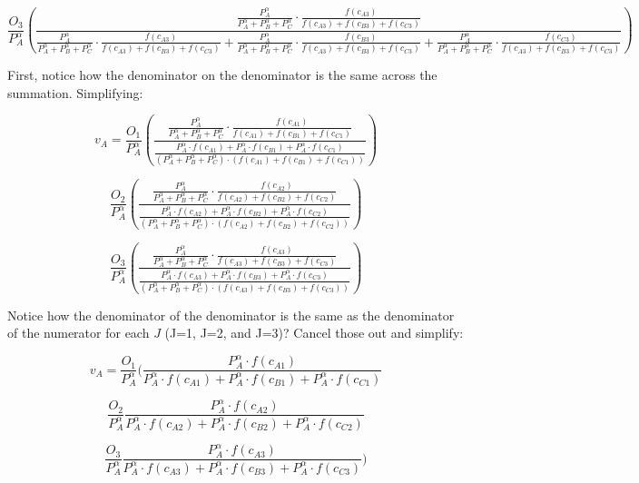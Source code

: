 \documentclass[]{elsarticle} %
\begin{document}
\[
\frac{O_3}{P_{A}^\alpha}(\frac{\frac{P_{A}^\alpha}{P_{A}^\alpha+P_{B}^\alpha+P_{C}^\alpha} \cdot \frac{f(c_{A3})}{f(c_{A3})+f(c_{B3})+f(c_{C3})}}{\frac{P_{A}^\alpha}{P_{A}^\alpha+P_{B}^\alpha+P_{C}^\alpha} \cdot \frac{f(c_{A3})}{f(c_{A3})+f(c_{B3})+f(c_{C3})} + \frac{P_{A}^\alpha}{P_{A}^\alpha+P_{B}^\alpha+P_{C}^\alpha} \cdot \frac{f(c_{B3})}{f(c_{A3})+f(c_{B3})+f(c_{C3})}+\frac{P_{A}^\alpha}{P_{A}^\alpha+P_{B}^\alpha+P_{C}^\alpha} \cdot \frac{f(c_{C3})}{f(c_{A3})+f(c_{B3})+f(c_{C3})}} )
\]

First, notice how the denominator on the denominator is the same across
the summation. Simplifying:

\[
v_{A} = \frac{O_1}{P_{A}^\alpha}(\frac{\frac{P_{A}^\alpha}{P_{A}^\alpha+P_{B}^\alpha+P_{C}^\alpha} \cdot \frac{f(c_{A1})}{f(c_{A1})+f(c_{B1})+f(c_{C1})}}{\frac{P_{A}^\alpha \cdot f(c_{A1}) + P_{A}^\alpha \cdot f(c_{B1}) + P_{A}^\alpha \cdot f(c_{C1})}{(P_{A}^\alpha+P_{B}^\alpha+P_{C}^\alpha) \cdot (f(c_{A1})+f(c_{B1})+f(c_{C1}))}})
\]

\[\frac{O_2}{P_{A}^\alpha}(\frac{\frac{P_{A}^\alpha}{P_{A}^\alpha+P_{B}^\alpha+P_{C}^\alpha} \cdot \frac{f(c_{A2})}{f(c_{A2})+f(c_{B2})+f(c_{C2})}}{\frac{P_{A}^\alpha \cdot f(c_{A2}) + P_{A}^\alpha \cdot f(c_{B2}) + P_{A}^\alpha \cdot f(c_{C2})}{(P_{A}^\alpha+P_{B}^\alpha+P_{C}^\alpha) \cdot (f(c_{A2})+f(c_{B2})+f(c_{C2}))}})
\]

\[
\frac{O_3}{P_{A}^\alpha}(\frac{\frac{P_{A}^\alpha}{P_{A}^\alpha+P_{B}^\alpha+P_{C}^\alpha} \cdot \frac{f(c_{A3})}{f(c_{A3})+f(c_{B3})+f(c_{C3})}}{\frac{P_{A}^\alpha \cdot f(c_{A3}) + P_{A}^\alpha \cdot f(c_{B3}) + P_{A}^\alpha \cdot f(c_{C3})}{(P_{A}^\alpha+P_{B}^\alpha+P_{C}^\alpha) \cdot (f(c_{A3})+f(c_{B3})+f(c_{C3}))}} )
\]

Notice how the denominator of the denominator is the same as the
denominator of the numerator for each \(J\) (J=1, J=2, and J=3)? Cancel
those out and simplify:

\[
v_{A} = \frac{O_1}{P_{A}^\alpha}(\frac{P_{A}^\alpha \cdot f(c_{A1})}{P_{A}^\alpha \cdot f(c_{A1}) + P_{A}^\alpha \cdot f(c_{B1}) + P_{A}^\alpha \cdot f(c_{C1})}
\]

\[\frac{O_2}{P_{A}^\alpha}\frac{P_{A}^\alpha \cdot f(c_{A2})}{P_{A}^\alpha \cdot f(c_{A2}) + P_{A}^\alpha \cdot f(c_{B2}) + P_{A}^\alpha \cdot f(c_{C2})}
\]

\[
\frac{O_3}{P_{A}^\alpha}\frac{P_{A}^\alpha \cdot f(c_{A3})}{P_{A}^\alpha \cdot f(c_{A3}) + P_{A}^\alpha \cdot f(c_{B3}) + P_{A}^\alpha \cdot f(c_{C3})} )
\]
\end{document}
